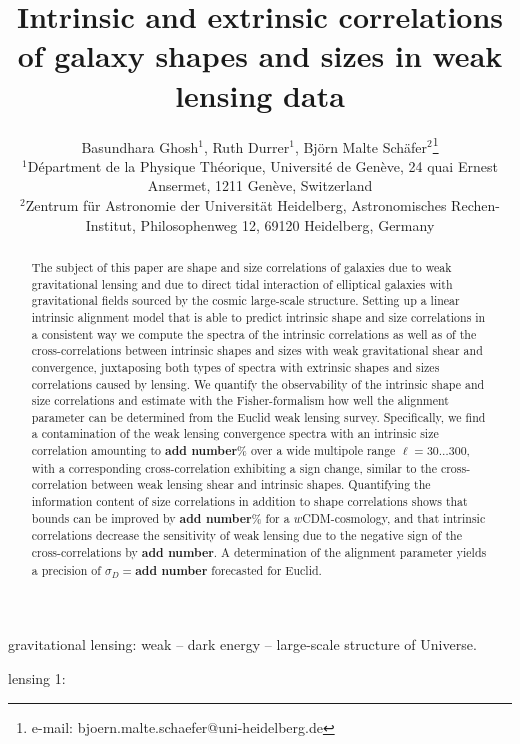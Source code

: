 \documentclass[a4paper,fleqn,usenatbib]{mnras}
\title[Intrinsic sizes and shapes of galaxies]
{Intrinsic and extrinsic correlations of galaxy shapes and sizes in weak lensing data}
\author[B. Ghosh, R. Durrer, B.M. Sch{\"a}fer]
{Basundhara Ghosh$^1$, Ruth Durrer$^1$, Bj{\"o}rn Malte Sch{\"a}fer$^2$\thanks{e-mail: bjoern.malte.schaefer@uni-heidelberg.de}\\
$^1$D{\'e}partment de la Physique Th{\'e}orique, Universit{\'e} de Gen{\`e}ve, 24 quai Ernest Ansermet, 1211 Gen{\`e}ve, Switzerland\\
$^2$Zentrum f{\"u}r Astronomie der Universit{\"a}t Heidelberg, Astronomisches Rechen-Institut, Philosophenweg 12, 69120 Heidelberg, Germany
}
\def\spirou#1{{\bf #1}}
\begin{document}
\pagerange{\pageref{firstpage}--\pageref{lastpage}}
\maketitle
\label{firstpage}


\begin{abstract}
The subject of this paper are shape and size correlations of galaxies due to weak gravitational lensing and due to direct tidal interaction of elliptical galaxies with gravitational fields sourced by the cosmic large-scale structure. Setting up a linear intrinsic alignment model that is able to predict intrinsic shape and size correlations in a consistent way we compute the spectra of the intrinsic correlations as well as of the cross-correlations between intrinsic shapes and sizes with weak gravitational shear and convergence, juxtaposing both types of spectra with extrinsic shapes and sizes correlations caused by lensing. We quantify the observability of the intrinsic shape and size correlations and estimate with the Fisher-formalism how well the alignment parameter can be determined from the Euclid weak lensing survey. Specifically, we find a contamination of the weak lensing convergence spectra with an intrinsic size correlation amounting to \spirou{add number}\% over a wide multipole range $\ell=30\ldots300$, with a corresponding cross-correlation exhibiting a sign change, similar to the cross-correlation between weak lensing shear and intrinsic shapes. Quantifying the information content of size correlations in addition to shape correlations shows that bounds can be improved by \spirou{add number}\% for a $w$CDM-cosmology, and that intrinsic correlations decrease the sensitivity of weak lensing due to the negative sign of the cross-correlations by \spirou{add number}. A determination of the alignment parameter yields a precision of $\sigma_D=$\spirou{add number} forecasted for Euclid.
\end{abstract}


\begin{keywords}
gravitational lensing: weak -- dark energy -- large-scale structure of Universe.
\end{keywords}


lensing 1: \citep{ayaita_investigating_2012,bartelmann_gravitational_2010,bartelmann_weak_2001,bate_when_2019,bernardeau_full-sky_2010,bernstein_comprehensive_2009,bernstein_dark_2004,bernstein_shapes_2002,blazek_beyond_2017,blazek_separating_2012,brainerd_weak_1996,capranico_intrinsic_2013,casarini_non-linear_2011,casarini_tomographic_2012,catelan_intrinsic_2001,chang_dark_2017,cooray_power_2001,cooray_weak_2001,cooray_weak_2002,crittenden_spin-induced_2001,de_jong_kilo-degree_2013,dodelson_weak_2005,dossett_figures_2011,douspis_tension_2019,grandis_information_2016,grassi_detecting_2014,heavens_3d_2003,heavens_combining_2013,heavens_intrinsic_2000,heavens_measuring_2006,heymans_cfhtlens_2013,heymans_weak_2003,hilbert_cosmic_2011,hirata_cross-correlation_2004,hollenstein_constraints_2009,hu_dark_2001,hu_dark_2002,hu_power_1999,hu_power_2001,hu_weak_1999,huff_magnificent_2011}
\end{document}
